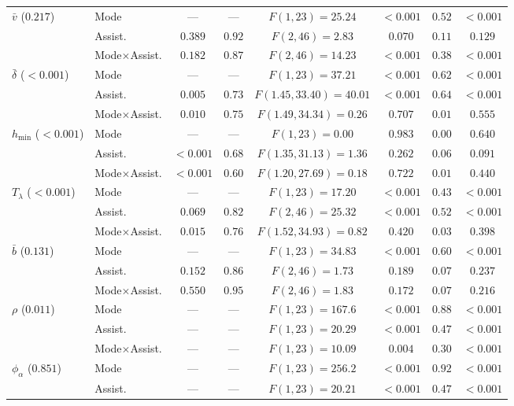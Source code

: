 \documentclass[12pt,a4paper,twoside,openright]{report}
\begin{document}
\begin{table}[p]
\begin{tabular}{@{}llcccccc@{}}
\addlinespace[2pt]
$\bar{v}$ ($0.217$) & Mode & --- & --- & $F(1,23)=25.24$ & $<0.001$ & $0.52$ & $<0.001$ \\
 & Assist. & $0.389$ & $0.92$ & $F(2,46)=2.83$ & $0.070$ & $0.11$ & $0.129$ \\
 & Mode$\times$Assist. & $0.182$ & $0.87$ & $F(2,46)=14.23$ & $<0.001$ & $0.38$ & $<0.001$ \\
\addlinespace[2pt]
$\bar{\delta}$ ($<0.001$) & Mode & --- & --- & $F(1,23)=37.21$ & $<0.001$ & $0.62$ & $<0.001$ \\
 & Assist. & $0.005$ & $0.73$ & $F(1.45,33.40)=40.01$ & $<0.001$ & $0.64$ & $<0.001$ \\
 & Mode$\times$Assist. & $0.010$ & $0.75$ & $F(1.49,34.34)=0.26$ & $0.707$ & $0.01$ & $0.555$ \\
\addlinespace[2pt]
$h_{\min}$ ($<0.001$) & Mode & --- & --- & $F(1,23)=0.00$ & $0.983$ & $0.00$ & $0.640$ \\
 & Assist. & $<0.001$ & $0.68$ & $F(1.35,31.13)=1.36$ & $0.262$ & $0.06$ & $0.091$ \\
 & Mode$\times$Assist. & $<0.001$ & $0.60$ & $F(1.20,27.69)=0.18$ & $0.722$ & $0.01$ & $0.440$ \\
\addlinespace[2pt]
$T_{\lambda}$ ($<0.001$) & Mode & --- & --- & $F(1,23)=17.20$ & $<0.001$ & $0.43$ & $<0.001$ \\
 & Assist. & $0.069$ & $0.82$ & $F(2,46)=25.32$ & $<0.001$ & $0.52$ & $<0.001$ \\
 & Mode$\times$Assist. & $0.015$ & $0.76$ & $F(1.52,34.93)=0.82$ & $0.420$ & $0.03$ & $0.398$ \\
\addlinespace[2pt]
$\bar{b}$ ($0.131$) & Mode & --- & --- & $F(1,23)=34.83$ & $<0.001$ & $0.60$ & $<0.001$ \\
 & Assist. & $0.152$ & $0.86$ & $F(2,46)=1.73$ & $0.189$ & $0.07$ & $0.237$ \\
 & Mode$\times$Assist. & $0.550$ & $0.95$ & $F(2,46)=1.83$ & $0.172$ & $0.07$ & $0.216$ \\
\addlinespace[2pt]
$\rho$ ($0.011$) & Mode & --- & --- & $F(1,23)=167.6$ & $<0.001$ & $0.88$ & $<0.001$ \\
 & Assist. & --- & --- & $F(1,23)=20.29$ & $<0.001$ & $0.47$ & $<0.001$ \\
 & Mode$\times$Assist. & --- & --- & $F(1,23)=10.09$ & $0.004$ & $0.30$ & $<0.001$ \\
\addlinespace[2pt]
$\phi_\alpha$ ($0.851$) & Mode & --- & --- & $F(1,23)=256.2$ & $<0.001$ & $0.92$ & $<0.001$ \\
 & Assist. & --- & --- & $F(1,23)=20.21$ & $<0.001$ & $0.47$ & $<0.001$ \\

\end{tabular}
\end{table}
\end{document}
